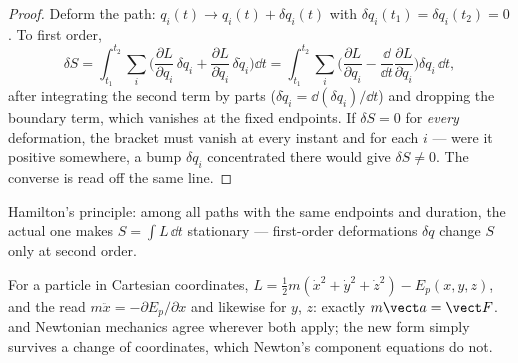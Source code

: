 \begin{proof}
Deform the path: $q_i(t) \to q_i(t) + \delta q_i(t)$ with
$\delta q_i(t_1) = \delta q_i(t_2) = 0$. To first order,
\[
\delta S = \int_{t_1}^{t_2}\sum_i\Big(
  \frac{\partial L}{\partial q_i}\,\delta q_i
 + \frac{\partial L}{\partial\dot q_i}\,\delta\dot q_i\Big)\dd t
 = \int_{t_1}^{t_2}\sum_i\Big(
  \frac{\partial L}{\partial q_i}
 - \frac{\dd}{\dd t}\frac{\partial L}{\partial\dot q_i}\Big)\delta q_i\,\dd t ,
\]
after integrating the second term by parts ($\delta\dot q_i =
\dd(\delta q_i)/\dd t$) and dropping the boundary term, which vanishes
at the fixed endpoints. If $\delta S = 0$ for \emph{every} deformation,
the bracket must vanish at every instant and for each $i$ --- were it
positive somewhere, a bump $\delta q_i$ concentrated there would give
$\delta S \neq 0$. The converse is read off the same line.
\end{proof}

\begin{omfigure}

{\small Hamilton's principle: among all paths with the same endpoints
and duration, the actual one makes $S = \int L\,\dd t$ stationary ---
first-order deformations $\delta q$ change $S$ only at second order.}
\end{omfigure}

\begin{proposition}\label{prop:b3:lagrangian-mechanics:newton}
For a particle in Cartesian coordinates, $L = \tfrac12 m(\dot x^2 +
\dot y^2 + \dot z^2) - E_p(x,y,z)$, and the 
read $m\ddot x = -\partial E_p/\partial x$ and likewise for $y$, $z$:
exactly $m\vect a = \vect F$.  and Newtonian mechanics agree
wherever both apply; the new form simply survives a change of
coordinates, which Newton's component equations do not.
\end{proposition}

